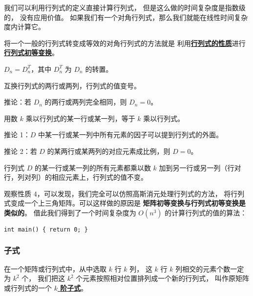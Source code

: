 \documentclass[UTF8]{article}
\begin{document}
	我们可以利用行列式的定义直接计算行列式，
	但是这么做的时间复杂度是指数级的，
	没有应用价值。
	如果我们有一个对角行列式，那么我们就能在线性时间复杂度内计算它。

	将一个一般的行列式转变成等效的对角行列式的方法就是
	利用\textbf{\uline{行列式的性质}}进行\textbf{\uline{行列式初等变换}}。

	\bigskip


	$D_n = D_n^T$，其中 $D_n^T$ 为 $D_n$ 的转置。

	\bigskip


	互换行列式的两行或两列，行列式的值变号。

	\qquad 推论：若 $D_n$ 的两行或两列完全相同，则 $D_n = 0$。

	\bigskip


	用数 $k$ 乘以行列式的某一行或某一列，等于 $k$ 乘以行列式。

	\qquad 推论 1：$D$ 中某一行或某一列中所有元素的因子可以提到行列式的外面。

	\qquad 推论 2：若 $D$ 的某两行或某两列的对应元素成比例，则 $D = 0$。

	\bigskip


	行列式 $D$ 的某一行或某一列的所有元素都乘以数 $k$
	加到另一行或另一列（行对行，列对列）的相应元素上，行列式的值不变。

	\bigskip


	观察性质 4，可以发现，我们完全可以仿照高斯消元处理行列式的方法，
	将行列式变成一个上三角矩阵。可以这样做的原因是
	\textbf{矩阵初等变换与行列式初等变换是类似的}。
	借此我们得到了一个时间复杂度为 $O(n^3)$ 的计算行列式的值的算法：

	\lstset{language=C++}
	\begin{lstlisting}
int main() { return 0; }
	\end{lstlisting}

	\subsubsection{子式}

	在一个矩阵或行列式中，从中选取 $k$ 行 $k$ 列，
	这 $k$ 行 $k$ 列相交的元素个数一定为 $k^2$ 个，
	我们把这 $k^2$ 个元素按照相对位置排列成一个新的行列式，
	叫作原矩阵或行列式的一个 \textbf{\uline{$k$ 阶子式}}。
\end{document}
